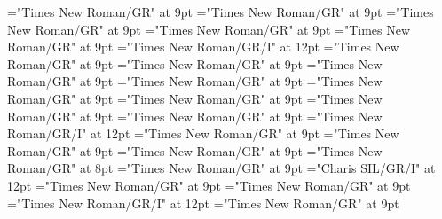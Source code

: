 \documentclass[gps1,twoside]{article}
\begin{document}
\font\spanspanslotsmorphosyntaxanalysissharedgrammaticalinfosensessubentrysubentriesentrybefore="Times New Roman/GR" at 9pt
\font\slotsmorphosyntaxanalysissharedgrammaticalinfosensessubentrysubentriesentrybefore="Times New Roman/GR" at 9pt
\font\spanspannameslotslotsmorphosyntaxanalysissharedgrammaticalinfosensessubentrysubentriesentrybefore="Times New Roman/GR" at 9pt
\font\spannameslotslotsmorphosyntaxanalysissharedgrammaticalinfosensessubentrysubentriesentrylastchildafter="Times New Roman/GR" at 9pt
\font\morphosyntaxanalysissensesensessubentrysubentriesentryafter="Times New Roman/GR" at 9pt
\font\morphosyntaxanalysissensesensessubentrysubentriesentry="Times New Roman/GR/I" at 12pt
\font\spanspanpartofspeechmorphosyntaxanalysissensesensessubentrysubentriesentrybefore="Times New Roman/GR" at 9pt
\font\spanpartofspeechmorphosyntaxanalysissensesensessubentrysubentriesentrylastchildafter="Times New Roman/GR" at 9pt
\font\spanspanslotsmorphosyntaxanalysissensesensessubentrysubentriesentrybefore="Times New Roman/GR" at 9pt
\font\slotsmorphosyntaxanalysissensesensessubentrysubentriesentrybefore="Times New Roman/GR" at 9pt
\font\spanspannameslotslotsmorphosyntaxanalysissensesensessubentrysubentriesentrybefore="Times New Roman/GR" at 9pt
\font\spannameslotslotsmorphosyntaxanalysissensesensessubentrysubentriesentrylastchildafter="Times New Roman/GR" at 9pt
\font\sensetypesensesensessubentrysubentriesentrybefore="Times New Roman/GR" at 9pt
\font\sensetypesensesensessubentrysubentriesentryafter="Times New Roman/GR" at 9pt
\font\sensetypesensesensessubentrysubentriesentry="Times New Roman/GR/I" at 12pt
\font\spanspanabbreviationsensetypesensesensessubentrysubentriesentrybefore="Times New Roman/GR" at 9pt
\font\spanspandefinitionorglosssensesensessubentrysubentriesentrybefore="Times New Roman/GR" at 9pt
\font\spandefinitionorglosssensesensessubentrysubentriesentrylastchildafter="Times New Roman/GR" at 9pt
\font\exampleexampleexamplessensesensessubentrysubentriesentrybefore="Times New Roman/GR" at 8pt
\font\examplessensesensessubentrysubentriesentryafter="Times New Roman/GR" at 9pt
\font\spanbzhexampleexampleexamplessensesensessubentrysubentriesentry="Charis SIL/GR/I" at 12pt
\font\spanspanexampleexampleexamplessensesensessubentrysubentriesentrybefore="Times New Roman/GR" at 9pt
\font\spanexampleexampleexamplessensesensessubentrysubentriesentrylastchildafter="Times New Roman/GR" at 9pt
\font\spanexampleexampleexamplessensesensessubentrysubentriesentry="Times New Roman/GR/I" at 12pt
\font\spanspantranslationtranslationtranslationsexampleexamplessensesensessubentrysubentriesentrybefore="Times New Roman/GR" at 9pt
\end{document}

